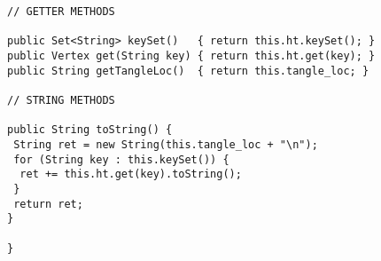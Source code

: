 \begin{Verbatim}
// GETTER METHODS

public Set<String> keySet()   { return this.ht.keySet(); }
public Vertex get(String key) { return this.ht.get(key); }
public String getTangleLoc()  { return this.tangle_loc; }

// STRING METHODS

public String toString() {
 String ret = new String(this.tangle_loc + "\n");
 for (String key : this.keySet()) {
  ret += this.ht.get(key).toString();
 }
 return ret;
}

}
\end{Verbatim}
